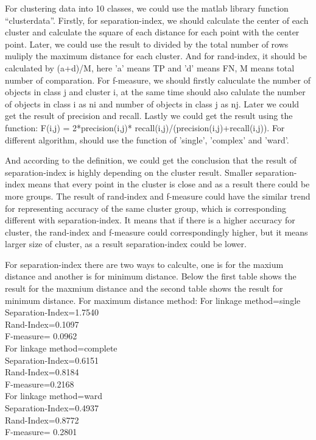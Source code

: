 \documentclass[]{article}
\begin{document}
For clustering data into 10 classes, we could use the matlab library function “clusterdata”. Firstly, for separation-index, we should calculate the center of each cluster and calculate the square of each distance for each point with the center point. Later, we could use the result to divided by the total number of rows muliply the maximum distance for each cluster. And for rand-index, it should be calculated by (a+d)/M, here 'a' means TP and 'd' means FN, M means total number of comparation. For f-measure, we should firstly caluculate the number of objects in class j and cluster i, at the same time should also calulate the number of objects in class i as ni and number of objects in class j as nj. Later we could get the result of precision and recall. Lastly we could get the result using the function:   
F(i,j) = 2*precision(i,j)* recall(i,j)/(precision(i,j)+recall(i,j)).
For different algorithm, should use the function of 'single', 'complex' and 'ward'.




And according to the definition, we could get the conclusion that the result of separation-index is highly depending on the cluster result. Smaller separation-index means that every point in the cluster is close and as a result there could be more groups.
The result of rand-index and f-measure could have the similar trend for representing accuracy of the same cluster group, which is corresponding different with separation-index. It means that if there is a higher accuracy for cluster, the rand-index and f-measure could correspondingly higher, but it means larger size of cluster, as a result separation-index could be lower.



For separation-index there are two ways to calculte, one is for the maxium distance and another is for minimum distance. Below the first table shows the result for the maxmium distance and the second table shows the result for minimum distance. 
For maximum distance method:
For linkage method=single\\
Separation-Index=1.7540 \\
Rand-Index=0.1097\\
F-measure= 0.0962\\
For linkage method=complete\\
Separation-Index=0.6151 \\
Rand-Index=0.8184 \\
F-measure=0.2168\\
For linkage method=ward\\
Separation-Index=0.4937 \\
Rand-Index=0.8772 \\
F-measure= 0.2801 \\
\end{document}
